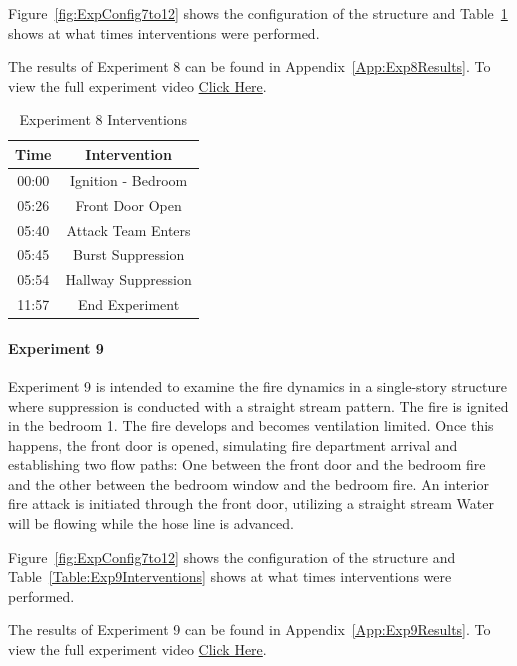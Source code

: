 \documentclass[12pt,oneside]{book}
\begin{document}
Figure~\ref{fig:ExpConfig7to12} shows the configuration of the structure and Table~\ref{Table:Exp8Interventions} shows at what times interventions were performed. 

The results of Experiment 8 can be found in Appendix~\ref{App:Exp8Results}. To view the full experiment video \href{https://youtu.be/gl8rc1Nsl1k}{Click Here}.

\begin{table}[H]
	\centering
	\caption{Experiment 8 Interventions}
	\begin{tabular}{|c|c|} 
		\hline
		Time & Intervention \\ \hline \hline
		00:00 & Ignition - Bedroom \\ \hline
		05:26 & Front Door Open \\ \hline
		05:40 & Attack Team Enters\\ \hline
		05:45 & Burst Suppression \\ \hline 
		05:54 & Hallway Suppression \\ \hline
		11:57 & End Experiment\\ \hline
	\end{tabular}
	\label{Table:Exp8Interventions}
\end{table}

\clearpage

\paragraph{Experiment 9} \mbox{}

Experiment 9 is intended to examine the fire dynamics in a single-story structure where suppression is conducted with a straight stream pattern. The fire is ignited in the bedroom 1. The fire develops and becomes ventilation limited. Once this happens, the front door is opened, simulating fire department arrival and establishing two flow paths: One between the front door and the bedroom fire and the other between the bedroom window and the bedroom fire. An interior fire attack is initiated through the front door, utilizing a straight stream Water will be flowing while the hose line is advanced. 

Figure~\ref{fig:ExpConfig7to12} shows the configuration of the structure and Table~\ref{Table:Exp9Interventions} shows at what times interventions were performed. 

The results of Experiment 9 can be found in Appendix~\ref{App:Exp9Results}. To view the full experiment video \href{https://youtu.be/gl8rc1Nsl1k}{Click Here}.
\end{document}
